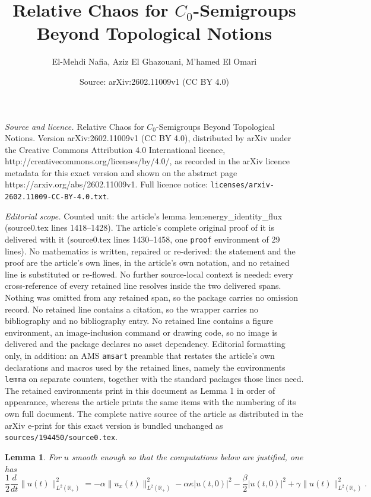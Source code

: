 \documentclass[10pt,a4paper]{amsart}
\title{Relative Chaos for $C_0$-Semigroups Beyond Topological Notions}
\author{El-Mehdi Nafia, Aziz El Ghazouani, M'hamed El Omari}
\date{Source: arXiv:2602.11009v1 (CC BY 4.0)}
\newtheorem{lemma}{Lemma}
\begin{document}
\maketitle

\noindent\emph{Source and licence.} Relative Chaos for $C_0$-Semigroups Beyond Topological Notions. Version arXiv:2602.11009v1 (CC BY 4.0), distributed by arXiv under the Creative Commons Attribution 4.0 International licence, http://creativecommons.org/licenses/by/4.0/, as recorded in the arXiv licence metadata for this exact version and shown on the abstract page https://arxiv.org/abs/2602.11009v1. Full licence notice: \texttt{licenses/arxiv-2602.11009-CC-BY-4.0.txt}.\par\smallskip

\noindent\textit{Editorial scope.} Counted unit: the article's lemma lem:energy\_identity\_flux (source0.tex lines 1418--1428). The article's complete original proof of it is delivered with it (source0.tex lines 1430--1458, one \texttt{proof} environment of 29 lines). No mathematics is written, repaired or re-derived: the statement and the proof are the article's own lines, in the article's own notation, and no retained line is substituted or re-flowed.  No further source-local context is needed: every cross-reference of every retained line resolves inside the two delivered spans.  Nothing was omitted from any retained span, so the package carries no omission record.  No retained line contains a citation, so the wrapper carries no bibliography and no bibliography entry.  No retained line contains a figure environment, an image-inclusion command or drawing code, so no image is delivered and the package declares no asset dependency.  Editorial formatting only, in addition: an AMS \texttt{amsart} preamble that restates the article's own declarations and macros used by the retained lines, namely the environments \texttt{lemma} on separate counters, together with the standard packages those lines need.  The retained environments print in this document as Lemma 1 in order of appearance, whereas the article prints the same items with the numbering of its own full document.  The complete native source of the article as distributed in the arXiv e-print for this exact version is bundled unchanged as \texttt{sources/194450/source0.tex}.
\begin{lemma}\label{lem:energy_identity_flux}
For $u$ smooth enough so that the computations below are justified, one has 
\begin{equation}\label{eq:energy_identity_flux}
\frac{1}{2}\frac{d}{dt}\|u(t)\|_{L^2(\mathbb{R}_+)}^2
=
-\alpha\|u_x(t)\|_{L^2(\mathbb{R}_+)}^2
-\alpha\kappa |u(t,0)|^2
-\frac{\beta}{2}|u(t,0)|^2
+\gamma\|u(t)\|_{L^2(\mathbb{R}_+)}^2 .
\end{equation}
\end{lemma}
\end{document}
